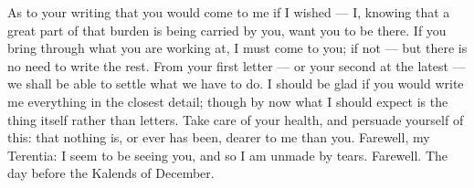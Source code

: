  As to your writing that you would come to me if I wished --- I, knowing that a great part of that burden is being carried by you, want you to be there. If you bring through what you are working at, I must come to you; if not --- but there is no need to write the rest. From your first letter --- or your second at the latest --- we shall be able to settle what we have to do. I should be glad if you would write me everything in the closest detail; though by now what I should expect is the thing itself rather than letters. Take care of your health, and persuade yourself of this: that nothing is, or ever has been, dearer to me than you. Farewell, my Terentia: I seem to be seeing you, and so I am unmade by tears. Farewell. The day before the Kalends of December.
